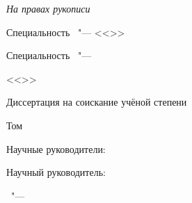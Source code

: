 \thispagestyle{empty}
\vspace*{5mm}
\begin{center}
\thesisOrganization
\end{center}
%
\vspace{17mm}
\begin{flushright}
	\textit{На правах рукописи}\\
\end{flushright}
%
\vspace{10mm}
\begin{center}
{\large\bfseries \thesisAuthor}
\end{center}
%
\vspace{2mm}
\begin{center}
\begin{minipage}{0.95\textwidth}
	\centering
	\textbf{\large \thesisTitle}
\end{minipage}

\vspace{6mm}
{%
Специальность \thesisSpecialtyNumber\ "--- <<\thesisSpecialtyTitle>>
}

\ifdefined\thesisSpecialtyTwoNumber
{%
Специальность \thesisSpecialtyTwoNumber\ "---

<<\thesisSpecialtyTwoTitle>>
}
\fi

\vspace{10mm}
Диссертация на соискание учёной степени

\thesisDegree

\vspace{5mm}
Том \thesisVolume
\end{center}
%
\vspace{12mm}
\begin{flushright}
\begin{minipage}{0.66\textwidth}
\raggedleft
\ifdefined\supervisorTwoFio
Научные руководители:

\supervisorRegalia

\ifdefined\supervisorDead
\framebox{\supervisorFio}
\else
\supervisorFio
\fi

\supervisorTwoRegalia

\ifdefined\supervisorTwoDead
\framebox{\supervisorTwoFio}
\else
\supervisorTwoFio
\fi
\else
Научный руководитель:

\supervisorRegalia

\ifdefined\supervisorDead
\framebox{\supervisorFio}
\else
\supervisorFio
\fi
\fi

\end{minipage}
\end{flushright}
%
\vspace{10mm}
{\centering\thesisCity\ "--- \thesisYear\par}
